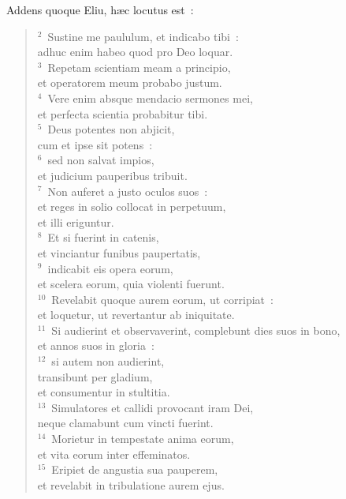\lettrine[lines=10,image=true,loversize=0.05,lraise=-0.03]{A}{}ddens quoque Eliu, h\ae c locutus est~:
\begin{flushleft}\begin{verse}\vspace{6pt}${}^{2}$~Sustine me paululum, et indicabo tibi~:\\ adhuc enim habeo quod pro Deo loquar.\\
${}^{3}$~Repetam scientiam meam a principio,\\ et operatorem meum probabo justum.\\
${}^{4}$~Vere enim absque mendacio sermones mei,\\ et perfecta scientia probabitur tibi.\\
${}^{5}$~Deus potentes non abjicit,\\ cum et ipse sit potens~:\\
${}^{6}$~sed non salvat impios,\\ et judicium pauperibus tribuit.\\
${}^{7}$~Non auferet a justo oculos suos~:\\ et reges in solio collocat in perpetuum,\\ et illi eriguntur.\\
${}^{8}$~Et si fuerint in catenis,\\ et vinciantur funibus paupertatis,\\
${}^{9}$~indicabit eis opera eorum,\\ et scelera eorum, quia violenti fuerunt.\\
${}^{10}$~Revelabit quoque aurem eorum, ut corripiat~:\\ et loquetur, ut revertantur ab iniquitate.\\
${}^{11}$~Si audierint et observaverint, complebunt dies suos in bono,\\ et annos suos in gloria~:\\
${}^{12}$~si autem non audierint,\\ transibunt per gladium,\\ et consumentur in stultitia.\\
${}^{13}$~Simulatores et callidi provocant iram Dei,\\ neque clamabunt cum vincti fuerint.\\
${}^{14}$~Morietur in tempestate anima eorum,\\ et vita eorum inter effeminatos.\\
${}^{15}$~Eripiet de angustia sua pauperem,\\ et revelabit in tribulatione aurem ejus.\\

\end{verse}
\end{flushleft}
